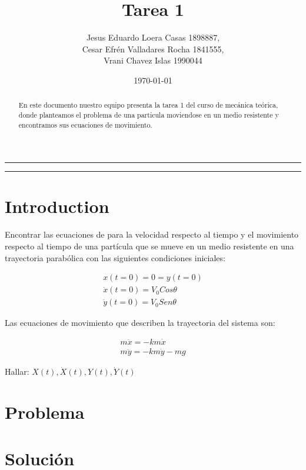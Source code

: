 \documentclass{article}
\title{Tarea 1}
\author{Jesus Eduardo Loera Casas 1898887,\\ Cesar Efrén Valladares Rocha 1841555,\\ Vrani Chavez Islas 1990044}
\date{\today}
\begin{document}


\tableofcontents			%

\begin{center}
	\rule[0mm]{150mm}{0.1mm}		%
	\end{center}
	
	
\begin{abstract}		%

	\noindent 				%
	En este documento nuestro equipo presenta la tarea 1 del curso de mecánica teórica, donde planteamos 
  el problema de una particula moviendose en un medio resistente y encontramos sus ecuaciones de 
  movimiento.
	\end{abstract}
	
\begin{center}
	\rule[0mm]{150mm}{0.1mm}
	\end{center}

\section{Introduction}		%
                            
  Encontrar las ecuaciones de para la velocidad respecto al tiempo y el movimiento respecto
  al tiempo de una partícula que se mueve en un medio resistente en una trayectoria parabólica 
  con las siguientes condiciones iniciales:

  \begin{gather*}
    x(t=0)=0=y(t=0) \\
    \dot{x} (t=0) = V_{0} Cos\theta \\
    \dot{y} (t=0) = V_{0} Sen\theta 
  \end{gather*}

  Las ecuaciones de movimiento que describen la trayectoria del sistema son:

  \begin{gather*}
    m\ddot{x} = -km\dot{x} \\
    m\ddot{y} = -km\dot{y}-mg
  \end{gather*}

  Hallar: $ X(t), \dot{X} (t) , Y(t), \dot{Y} (t) $

\section{Problema}

\section{Solución}

 

 
\end{document}
